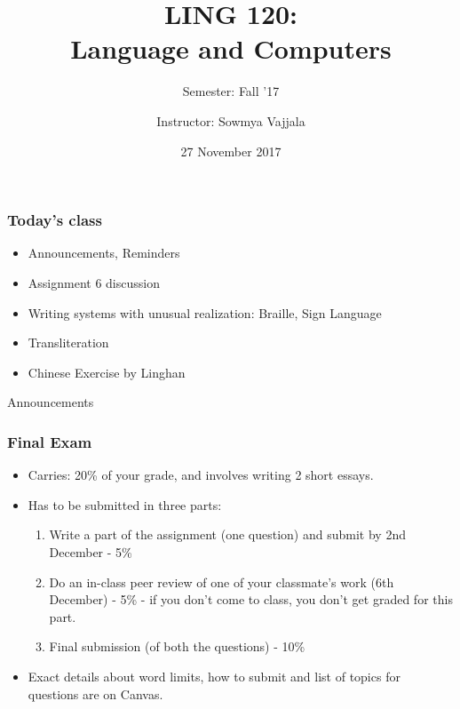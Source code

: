 \documentclass{beamer}
\author[Sowmya Vajjala]{Instructor: Sowmya Vajjala}
\title[LING 120]{LING 120: \\ Language and Computers}
\subtitle{Semester: Fall '17}
\date{27 November 2017}
\institute{Iowa State University, USA}
\begin{document}
\begin{frame}\titlepage
\end{frame}


\begin{frame}
\frametitle{Today's class}
\begin{itemize}
\item Announcements, Reminders
\item Assignment 6 discussion
\item Writing systems with unusual realization: Braille, Sign Language
\item Transliteration
\item Chinese Exercise by Linghan %
\end{itemize}
\end{frame}

\begin{frame}
\centering
\Large Announcements
\end{frame}

\begin{frame}
\frametitle{Final Exam}
\begin{itemize}
\item Carries: 20\% of your grade, and involves writing 2 short essays. 
\item Has to be submitted in three parts:
\begin{enumerate}
\item Write a part of the assignment (one question) and submit by 2nd December - 5\%
\item Do an in-class peer review of one of your classmate's work (6th December) - 5\% - if you don't come to class, you don't get graded for this part.
\item Final submission (of both the questions) - 10\%
\end{enumerate}
\item Exact details about word limits, how to submit and list of topics for questions are on Canvas. 
\end{itemize}
\end{frame}
\end{document}
